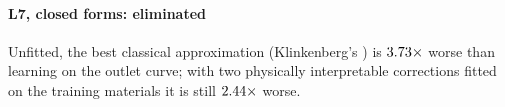 \paragraph{L7, closed forms: eliminated} Unfitted, the best classical approximation
(Klinkenberg's \cite{klinkenberg1948numerical,klinkenberg1954heat}) is
\(3.73\times\) worse than learning on the outlet curve; with two physically
interpretable corrections fitted on the training materials it is still
\(2.44\times\) worse.

